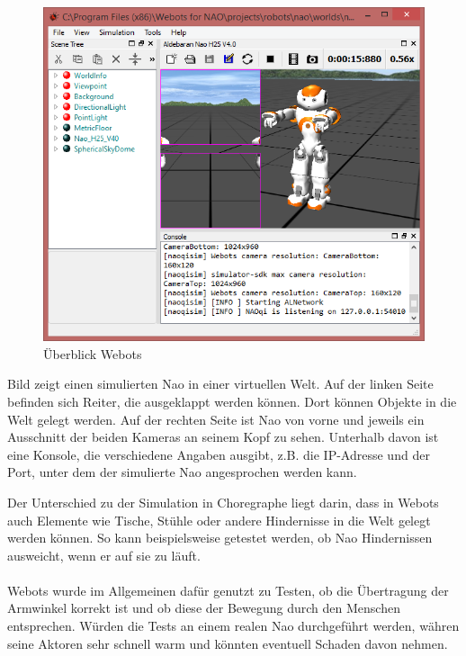 \begin{figure}[H]						
	\centering							
	\includegraphics[scale=1.0]{Bilder/webots.png}			
	\caption{Überblick Webots}						
	\label{f:nao_webots}						
\end{figure}
\noindent
Bild  zeigt einen simulierten Nao in einer virtuellen Welt. Auf der linken Seite befinden sich Reiter, die ausgeklappt werden können. Dort können Objekte in die Welt gelegt werden. Auf der rechten Seite ist Nao von vorne und jeweils ein Ausschnitt der beiden Kameras an seinem Kopf zu sehen. Unterhalb davon ist eine Konsole, die verschiedene Angaben ausgibt, z.B. die IP-Adresse und der Port, unter dem der simulierte Nao angesprochen werden kann.

Der Unterschied zu der Simulation in Choregraphe liegt darin, dass in Webots auch Elemente wie Tische, Stühle oder andere Hindernisse in die Welt gelegt werden können. So kann beispielsweise getestet werden, ob Nao Hindernissen ausweicht, wenn er auf sie zu läuft.
\\
\\
Webots wurde im Allgemeinen dafür genutzt zu Testen, ob die Übertragung der Armwinkel korrekt ist und ob diese der Bewegung durch den Menschen entsprechen. Würden die Tests an einem realen Nao durchgeführt werden, währen seine Aktoren sehr schnell warm und könnten eventuell Schaden davon nehmen.





